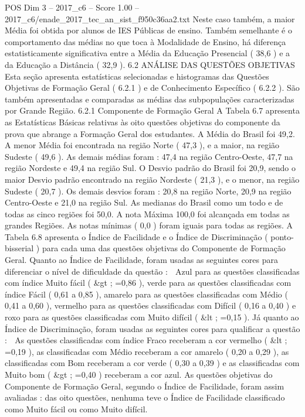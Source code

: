\begin{textsample}{POS Dim 3 – 2017\_c6 – Score 1.00 – 2017\_c6/enade\_2017\_tec\_an\_sist\_f950c36aa2.txt}
Neste caso também, a maior Média foi obtida por alunos de IES Públicas de ensino.
Também semelhante é o comportamento das médias no que toca à Modalidade de Ensino, há diferença estatisticamente significativa entre a Média da Educação Presencial ( 38,6 ) e a da Educação a Distância ( 32,9 ). 6.2 ANÁLISE DAS QUESTÕES OBJETIVAS Esta seção apresenta estatísticas selecionadas e histogramas das Questões Objetivas de Formação Geral ( 6.2.1 ) e de Conhecimento Específico ( 6.2.2 ).
São também apresentadas e comparadas as médias das subpopulações caracterizadas por Grande Região. 6.2.1 Componente de Formação Geral A Tabela 6.7 apresenta as Estatísticas Básicas relativas às oito questões objetivas do componente da prova que abrange a Formação Geral dos estudantes.
A Média do Brasil foi 49,2.
A menor Média foi encontrada na região Norte ( 47,3 ), e a maior, na região Sudeste ( 49,6 ).
As demais médias foram : 47,4 na região Centro-Oeste, 47,7 na região Nordeste e 49,4 na região Sul.
O Desvio padrão do Brasil foi 20,9, sendo o maior Desvio padrão encontrado na região Nordeste ( 21,3 ), e o menor, na região Sudeste ( 20,7 ).
Os demais desvios foram : 20,8 na região Norte, 20,9 na região Centro-Oeste e 21,0 na região Sul.
As medianas do Brasil como um todo e de todas as cinco regiões foi 50,0.
A nota Máxima 100,0 foi alcançada em todas as grandes Regiões.
As notas mínimas ( 0,0 ) foram iguais para todas as regiões.
A Tabela 6.8 apresenta o Índice de Facilidade e o Índice de Discriminação ( ponto-bisserial ) para cada uma das questões objetivas do Componente de Formação Geral.
Quanto ao Índice de Facilidade, foram usadas as seguintes cores para diferenciar o nível de dificuldade da questão :  Azul para as questões classificadas com índice Muito fácil ( \&gt ; =0,86 ), verde para as questões classificadas com índice Fácil ( 0,61 a 0,85 ), amarelo para as questões classificadas com Médio ( 0,41 a 0,60 ), vermelho para as questões classificadas com Difícil ( 0,16 a 0,40 ) e roxo para as questões classificadas com Muito difícil ( \&lt ; =0,15 ).
Já quanto ao Índice de Discriminação, foram usadas as seguintes cores para qualificar a questão :  As questões classificadas com índice Fraco receberam a cor vermelho ( \&lt ; =0,19 ), as classificadas com Médio receberam a cor amarelo ( 0,20 a 0,29 ), as classificadas com Bom receberam a cor verde ( 0,30 a 0,39 ) e as classificadas com Muito bom ( \&gt ; =0,40 ) receberam a cor azul.
As questões objetivas do Componente de Formação Geral, segundo o Índice de Facilidade, foram assim avaliadas : das oito questões, nenhuma teve o Índice de Facilidade classificado como Muito fácil ou como Muito difícil.

\end{textsample}
